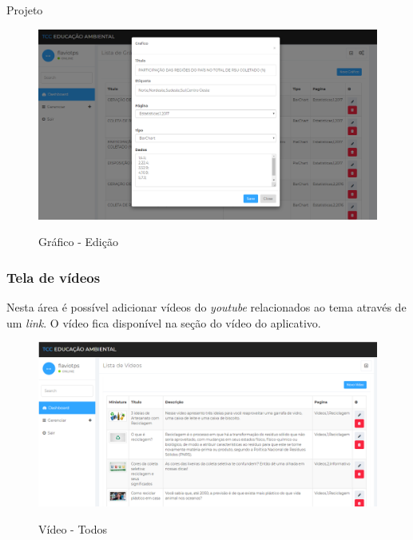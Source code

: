 \documentclass[
	12pt,				%
	openany,			%
	twoside,			%
	a4paper,			%
	english,			%
	french,				%
	spanish,			%
	brazil				%
	]{abntex2}
\begin{document}
\begin{chapter}{Projeto}
\begin{figure}[h]
\centering
   \caption{Gráfico - Edição}
   \includegraphics[scale=0.40]{media/tela_graficos_site_2.png}
     \label{fig:tela_graficos_site_2}
\end{figure}

\newpage
\subsubsection{Tela de vídeos} \label{tela_video}
Nesta área é possível adicionar vídeos do \textit{youtube} relacionados ao tema através de um \textit{link}. O vídeo fica disponível na seção do vídeo do aplicativo.

\begin{figure}[h]
\centering
   \caption{Vídeo - Todos}
   \includegraphics[scale=0.40]{media/tela_video_site_1.png}
     \label{fig:tela_video_site_1}
\end{figure}


\end{chapter}
\end{document}

